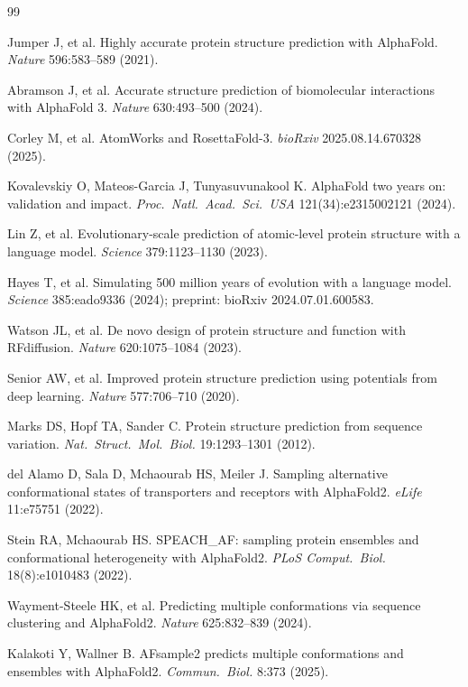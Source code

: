 \documentclass[11pt]{article}
\begin{document}
\begin{thebibliography}{99}

Jumper J, et al. Highly accurate protein structure prediction with
AlphaFold. \emph{Nature} 596:583--589 (2021).

Abramson J, et al. Accurate structure prediction of biomolecular
interactions with AlphaFold 3. \emph{Nature} 630:493--500 (2024).

Corley M, et al. AtomWorks and RosettaFold-3. \emph{bioRxiv}
2025.08.14.670328 (2025).

Kovalevskiy O, Mateos-Garcia J, Tunyasuvunakool K. AlphaFold two years on:
validation and impact. \emph{Proc.\ Natl.\ Acad.\ Sci.\ USA}
121(34):e2315002121 (2024).

Lin Z, et al. Evolutionary-scale prediction of atomic-level protein
structure with a language model. \emph{Science} 379:1123--1130 (2023).

Hayes T, et al. Simulating 500 million years of evolution with a language
model. \emph{Science} 385:eado9336 (2024); preprint:
bioRxiv 2024.07.01.600583.

Watson JL, et al. De novo design of protein structure and function with
RFdiffusion. \emph{Nature} 620:1075--1084 (2023).

Senior AW, et al. Improved protein structure prediction using potentials
from deep learning. \emph{Nature} 577:706--710 (2020).

Marks DS, Hopf TA, Sander C. Protein structure prediction from sequence
variation. \emph{Nat.\ Struct.\ Mol.\ Biol.} 19:1293--1301 (2012).

del Alamo D, Sala D, Mchaourab HS, Meiler J. Sampling alternative
conformational states of transporters and receptors with AlphaFold2.
\emph{eLife} 11:e75751 (2022).

Stein RA, Mchaourab HS. SPEACH\_AF: sampling protein ensembles and
conformational heterogeneity with AlphaFold2. \emph{PLoS Comput.\ Biol.}
18(8):e1010483 (2022).

Wayment-Steele HK, et al. Predicting multiple conformations via sequence
clustering and AlphaFold2. \emph{Nature} 625:832--839 (2024).

Kalakoti Y, Wallner B. AFsample2 predicts multiple conformations and
ensembles with AlphaFold2. \emph{Commun.\ Biol.} 8:373 (2025).


\end{thebibliography}
\end{document}
